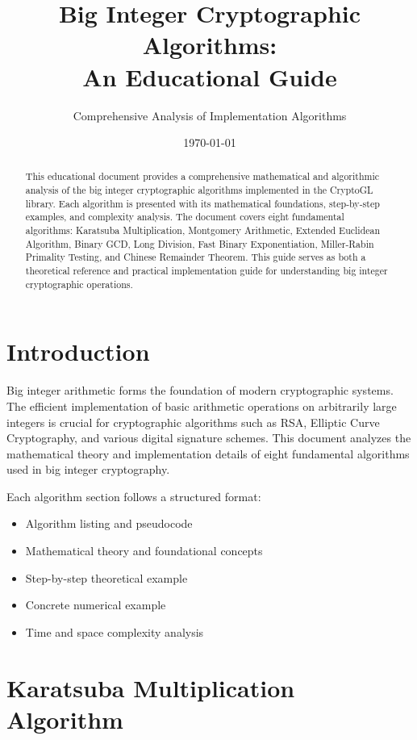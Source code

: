 \documentclass[12pt,a4paper]{article}
\title{\textbf{Big Integer Cryptographic Algorithms:\\An Educational Guide}}
\author{Comprehensive Analysis of Implementation Algorithms}
\date{\today}
\theoremstyle{definition}
\begin{document}
\maketitle

\begin{abstract}
This educational document provides a comprehensive mathematical and algorithmic analysis of the big integer cryptographic algorithms implemented in the CryptoGL library. Each algorithm is presented with its mathematical foundations, step-by-step examples, and complexity analysis. The document covers eight fundamental algorithms: Karatsuba Multiplication, Montgomery Arithmetic, Extended Euclidean Algorithm, Binary GCD, Long Division, Fast Binary Exponentiation, Miller-Rabin Primality Testing, and Chinese Remainder Theorem. This guide serves as both a theoretical reference and practical implementation guide for understanding big integer cryptographic operations.
\end{abstract}

\tableofcontents
\newpage

\section{Introduction}

Big integer arithmetic forms the foundation of modern cryptographic systems. The efficient implementation of basic arithmetic operations on arbitrarily large integers is crucial for cryptographic algorithms such as RSA, Elliptic Curve Cryptography, and various digital signature schemes. This document analyzes the mathematical theory and implementation details of eight fundamental algorithms used in big integer cryptography.

Each algorithm section follows a structured format:
\begin{itemize}
    \item Algorithm listing and pseudocode
    \item Mathematical theory and foundational concepts
    \item Step-by-step theoretical example
    \item Concrete numerical example
    \item Time and space complexity analysis
\end{itemize}

\section{Karatsuba Multiplication Algorithm}
\end{document}
